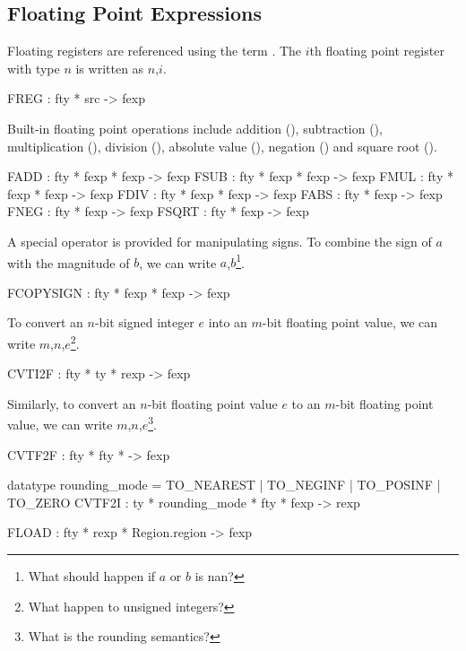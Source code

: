 \subsection{Floating Point Expressions}

 Floating registers are referenced using the term .  The
$i$th floating point register with type $n$ is written 
as $n$,$i$\sml{)}.
\begin{SML}
   FREG   : fty * src -> fexp
\end{SML}

Built-in floating point operations include addition (), 
subtraction (), multiplication (), division 
(), absolute value (), negation ()
and square root ().
\begin{SML}
   FADD  : fty * fexp * fexp -> fexp
   FSUB  : fty * fexp * fexp  -> fexp
   FMUL  : fty * fexp * fexp -> fexp
   FDIV  : fty * fexp * fexp -> fexp
   FABS  : fty * fexp -> fexp
   FNEG  : fty * fexp -> fexp
   FSQRT : fty * fexp -> fexp
\end{SML}

A special operator is provided for manipulating signs.
To combine the sign of $a$ with the magnitude of $b$, we can
write $a$,$b$\sml{)}\footnote{What should 
happen if $a$ or $b$ is nan?}.
\begin{SML}
   FCOPYSIGN : fty * fexp * fexp -> fexp
\end{SML}

To convert an $n$-bit signed integer $e$ into an $m$-bit floating point value,
we can write $m$,$n$,$e$\sml{)}\footnote{What happen to unsigned integers?}.
\begin{SML}
   CVTI2F : fty * ty * rexp -> fexp
\end{SML}

Similarly, to convert an $n$-bit floating point value $e$ to an $m$-bit
floating point value, we can write $m$,$n$,$e$\sml{)}\footnote{
What is the rounding semantics?}.
\begin{SML}
   CVTF2F : fty * fty * -> fexp
\end{SML}

\begin{SML}
  datatype rounding_mode = TO_NEAREST | TO_NEGINF | TO_POSINF | TO_ZERO
  CVTF2I : ty * rounding_mode * fty * fexp -> rexp
\end{SML}

\begin{SML}
   FLOAD : fty * rexp * Region.region -> fexp
\end{SML}

